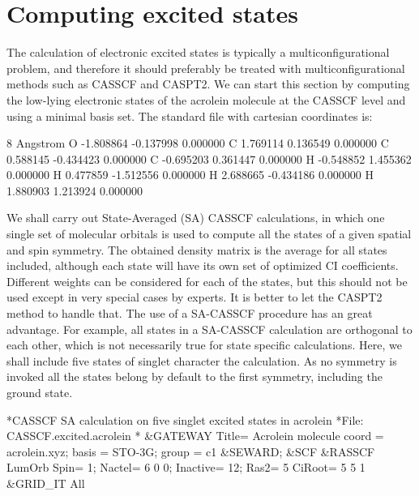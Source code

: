 \section{Computing excited states}

The calculation of electronic excited states is typically a multiconfigurational problem, and
therefore it should preferably be treated with multiconfigurational methods such as CASSCF and
CASPT2. We can start this section by computing the low-lying electronic states of the
acrolein molecule at the CASSCF level and using a minimal 
basis set. The  standard file with cartesian coordinates is:

\begin{inputlisting}
 8
Angstrom
 O      -1.808864   -0.137998    0.000000
 C       1.769114    0.136549    0.000000
 C       0.588145   -0.434423    0.000000
 C      -0.695203    0.361447    0.000000
 H      -0.548852    1.455362    0.000000
 H       0.477859   -1.512556    0.000000
 H       2.688665   -0.434186    0.000000
 H       1.880903    1.213924    0.000000
\end{inputlisting}

We shall carry out State-Averaged (SA) CASSCF calculations, in which one single 
set of molecular orbitals is used to compute all the states of a given spatial 
and spin symmetry. The obtained density matrix is the average for all states 
included, although each state will have its own set of optimized CI 
coefficients. Different weights can be considered for each of the states, 
but this should not be used except in very special cases by experts. It is 
better to let the CASPT2 method to handle that. The use of a SA-CASSCF 
procedure has an great advantage. For example, all states in a SA-CASSCF 
calculation are orthogonal to each other, which is not necessarily true for
state specific calculations. Here, we shall include five states of singlet 
character the calculation. As no symmetry is invoked all the states belong by 
default to the first symmetry, including the ground state.

\begin{inputlisting}
*CASSCF SA calculation on five singlet excited states in acrolein
*File: CASSCF.excited.acrolein
*
&GATEWAY
  Title= Acrolein molecule
  coord = acrolein.xyz; basis = STO-3G; group = c1
&SEWARD; &SCF
&RASSCF
  LumOrb
  Spin= 1; Nactel= 6 0 0; Inactive= 12; Ras2= 5
  CiRoot= 5 5 1
&GRID_IT
  All
\end{inputlisting}


